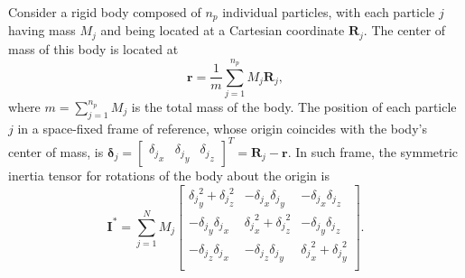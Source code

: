 \documentclass[aip,jcp,reprint,amsmath,amssymb]{revtex4-1}
\newcommand{\mt}[1]{\boldsymbol{\mathbf{#1}}}           %
\newcommand{\vt}[1]{\boldsymbol{\mathbf{#1}}}           %
\newcommand{\tr}[1]{#1^T}                               %
\begin{document}
Consider a rigid body composed of $n_p$ individual particles, with each particle $j$ having mass $M_j$ and being located at a Cartesian coordinate $\vt R_j$. The center of mass of this body is located at
\[
\vt r = \frac{1}{m}\sum_{j=1}^{n_p} M_j {\vt R}_j,
\]
where $m = \sum_{j=1}^{n_p} M_j$ is the total mass of the body. The position of each particle $j$ in a space-fixed frame of reference, whose origin coincides with the body's center of mass, is ${\vt \delta}_j = \tr{ [\begin{array}{ccc} {\delta_j}_x & {\delta_j}_y & {\delta_j}_z \end{array}]} = {\vt R}_j - {\vt r}$. In such frame, the symmetric inertia tensor for rotations of the body about the origin is\cite{Goldstein2002}
\[
{\mt I}^\ast = \sum_{j=1}^N M_j \left[ \begin{array}{ccc}
{\delta_j}_y^2 + {\delta_j}_z^2 & -{\delta_j}_x {\delta_j}_y & -{\delta_j}_x {\delta_j}_z \\
-{\delta_j}_y {\delta_j}_x & {\delta_j}_x^2 + {\delta_j}_z^2 & -{\delta_j}_y {\delta_j}_z \\
-{\delta_j}_z {\delta_j}_x & -{\delta_j}_z {\delta_j}_y & {\delta_j}_x^2 + {\delta_j}_y^2 \\
\end{array} \right].
\]
\end{document}
